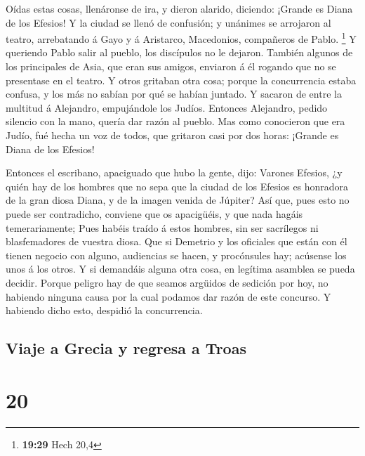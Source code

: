  Oídas estas cosas, llenáronse de ira, y dieron alarido,
diciendo: ¡Grande es Diana de los Efesios!  Y la ciudad se
llenó de confusión; y unánimes se arrojaron al teatro, arrebatando á
Gayo y á Aristarco, Macedonios, compañeros de Pablo. \footnote{\textbf{19:29}
  Hech 20,4}  Y queriendo Pablo salir al pueblo, los
discípulos no le dejaron.  También algunos de los
principales de Asia, que eran sus amigos, enviaron á él rogando que no
se presentase en el teatro.  Y otros gritaban otra cosa;
porque la concurrencia estaba confusa, y los más no sabían por qué se
habían juntado.  Y sacaron de entre la multitud á
Alejandro, empujándole los Judíos. Entonces Alejandro, pedido silencio
con la mano, quería dar razón al pueblo.  Mas como
conocieron que era Judío, fué hecha un voz de todos, que gritaron casi
por dos horas: ¡Grande es Diana de los Efesios!

 Entonces el escribano, apaciguado que hubo la gente, dijo:
Varones Efesios, ¿y quién hay de los hombres que no sepa que la ciudad
de los Efesios es honradora de la gran diosa Diana, y de la imagen
venida de Júpiter?  Así que, pues esto no puede ser
contradicho, conviene que os apacigüéis, y que nada hagáis
temerariamente;  Pues habéis traído á estos hombres, sin
ser sacrílegos ni blasfemadores de vuestra diosa.  Que si
Demetrio y los oficiales que están con él tienen negocio con alguno,
audiencias se hacen, y procónsules hay; acúsense los unos á los otros.
 Y si demandáis alguna otra cosa, en legítima asamblea se
pueda decidir.  Porque peligro hay de que seamos argüidos
de sedición por hoy, no habiendo ninguna causa por la cual podamos dar
razón de este concurso. Y habiendo dicho esto, despidió la concurrencia.

\hypertarget{viaje-a-grecia-y-regresa-a-troas}{%
\subsection{Viaje a Grecia y regresa a
Troas}\label{viaje-a-grecia-y-regresa-a-troas}}

\hypertarget{section-19}{%
\section{20}\label{section-19}}

